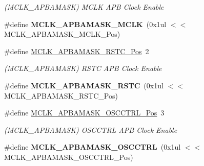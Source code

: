 \begin{DoxyCompactItemize}
\begin{DoxyCompactList}\small\item\em (M\+C\+L\+K\+\_\+\+A\+P\+B\+A\+M\+A\+S\+K) M\+C\+L\+K A\+P\+B Clock Enable \end{DoxyCompactList}\item 
\hypertarget{group___s_a_m_l21___m_c_l_k_gae1adde513e3034e9af1d3b83675bbfee}{}\#define {\bfseries M\+C\+L\+K\+\_\+\+A\+P\+B\+A\+M\+A\+S\+K\+\_\+\+M\+C\+L\+K}~(0x1ul $<$$<$ M\+C\+L\+K\+\_\+\+A\+P\+B\+A\+M\+A\+S\+K\+\_\+\+M\+C\+L\+K\+\_\+\+Pos)\label{group___s_a_m_l21___m_c_l_k_gae1adde513e3034e9af1d3b83675bbfee}

\item 
\hypertarget{group___s_a_m_l21___m_c_l_k_ga23015f90db0192052e8d0a971684fa6e}{}\#define \hyperlink{group___s_a_m_l21___m_c_l_k_ga23015f90db0192052e8d0a971684fa6e}{M\+C\+L\+K\+\_\+\+A\+P\+B\+A\+M\+A\+S\+K\+\_\+\+R\+S\+T\+C\+\_\+\+Pos}~2\label{group___s_a_m_l21___m_c_l_k_ga23015f90db0192052e8d0a971684fa6e}

\begin{DoxyCompactList}\small\item\em (M\+C\+L\+K\+\_\+\+A\+P\+B\+A\+M\+A\+S\+K) R\+S\+T\+C A\+P\+B Clock Enable \end{DoxyCompactList}\item 
\hypertarget{group___s_a_m_l21___m_c_l_k_ga6336e4028597b8188dc6d9408d8bc80d}{}\#define {\bfseries M\+C\+L\+K\+\_\+\+A\+P\+B\+A\+M\+A\+S\+K\+\_\+\+R\+S\+T\+C}~(0x1ul $<$$<$ M\+C\+L\+K\+\_\+\+A\+P\+B\+A\+M\+A\+S\+K\+\_\+\+R\+S\+T\+C\+\_\+\+Pos)\label{group___s_a_m_l21___m_c_l_k_ga6336e4028597b8188dc6d9408d8bc80d}

\item 
\hypertarget{group___s_a_m_l21___m_c_l_k_gac3c888b7b8de3be9e61afcf2aff6dff2}{}\#define \hyperlink{group___s_a_m_l21___m_c_l_k_gac3c888b7b8de3be9e61afcf2aff6dff2}{M\+C\+L\+K\+\_\+\+A\+P\+B\+A\+M\+A\+S\+K\+\_\+\+O\+S\+C\+C\+T\+R\+L\+\_\+\+Pos}~3\label{group___s_a_m_l21___m_c_l_k_gac3c888b7b8de3be9e61afcf2aff6dff2}

\begin{DoxyCompactList}\small\item\em (M\+C\+L\+K\+\_\+\+A\+P\+B\+A\+M\+A\+S\+K) O\+S\+C\+C\+T\+R\+L A\+P\+B Clock Enable \end{DoxyCompactList}\item 
\hypertarget{group___s_a_m_l21___m_c_l_k_ga14f0797fb3f869e7dae0d1f669c1baef}{}\#define {\bfseries M\+C\+L\+K\+\_\+\+A\+P\+B\+A\+M\+A\+S\+K\+\_\+\+O\+S\+C\+C\+T\+R\+L}~(0x1ul $<$$<$ M\+C\+L\+K\+\_\+\+A\+P\+B\+A\+M\+A\+S\+K\+\_\+\+O\+S\+C\+C\+T\+R\+L\+\_\+\+Pos)\label{group___s_a_m_l21___m_c_l_k_ga14f0797fb3f869e7dae0d1f669c1baef}


\end{DoxyCompactItemize}
